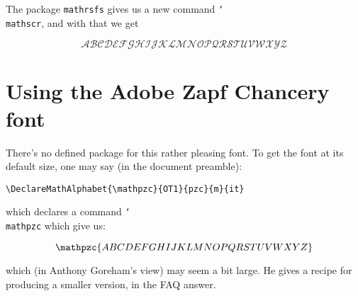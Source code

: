 \documentclass[a4paper]{article}
\DeclareRobustCommand\cs[1]{\texttt{\char`\\#1}}
\begin{document}
The package \texttt{mathrsfs} gives us a new command \cs{mathscr}, and
with that we get

$$\mathscr{ABCDEFGHIJKLMNOPQRSTUVWXYZ}$$

\section{Using the Adobe Zapf Chancery font}

There's no defined package for this rather pleasing font.  To get the
font at its default size, one may say (in the document preamble):
\begin{verbatim}
\DeclareMathAlphabet{\mathpzc}{OT1}{pzc}{m}{it}
\end{verbatim}
which declares a command \cs{mathpzc} which give us:

$$\mathpzc{ABCDEFGHIJKLMNOPQRSTUVWXYZ}$$

\noindent which (in Anthony Goreham's view) may seem a bit large.  He
gives a recipe for producing a smaller version, in the FAQ answer.

%
%
\end{document}
